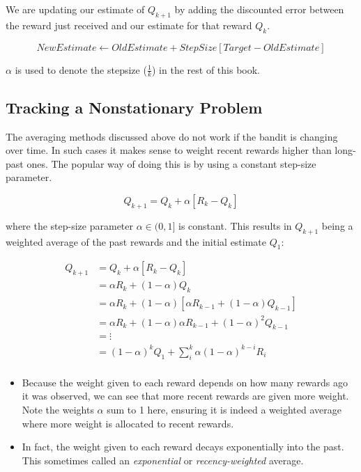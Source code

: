 We are updating our estimate of \(Q_{k+1}\) by adding the discounted error between the reward just received and our estimate for that reward \(Q_k\).

\begin{equation}
NewEstimate \leftarrow OldEstimate + StepSize \left[Target - OldEstimate \right]
\end{equation}

\(\alpha\) is used to denote the stepsize (\(\frac{1}{k}\)) in the rest of this book.

\subsection{Tracking a Nonstationary Problem}
The averaging methods discussed above do not work if the bandit is changing over time. In such cases it makes sense to weight recent rewards higher than long-past ones. The popular way of doing this is by using a constant step-size parameter.

\begin{equation}
	Q_{k+1} = Q_k +\alpha \left[R_k - Q_k\right]
\end{equation}

where the step-size parameter \(\alpha \in (0,1]\) is constant. This results in \(Q_{k+1}\) being a weighted average of the past rewards and the initial estimate \(Q_1\):

\begin{align}
Q_{k+1} &= Q_k +\alpha \left[R_k - Q_k\right] \nonumber \\
&= \alpha R_k + (1 - \alpha)Q_k \nonumber \\
&= \alpha R_k + (1 - \alpha)[\alpha R_{k-1} + (1 - \alpha)Q_{k-1}] \nonumber \\
&= \alpha R_k + (1 - \alpha)\alpha R_{k-1} + (1 - \alpha)^2 Q_{k-1}  \nonumber \\
&= \vdots \nonumber \\
&= (1-\alpha)^k Q_1 + \sum_{i}^{k} \alpha (1 - \alpha)^{k-i} R_i \\
\end{align}

\begin{itemize}
\item Because the weight given to each reward depends on how many rewards ago it was observed, we can see that more recent rewards are given more weight. Note the weights \(\alpha\) sum to 1 here, ensuring it is indeed a weighted average where more weight is allocated to recent rewards.
\item In fact, the weight given to each reward decays exponentially into the past. This sometimes called an \textit{exponential} or \textit{recency-weighted} average.
\end{itemize}

